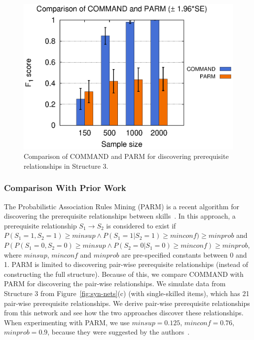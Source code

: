 \documentclass{edm_template}
\begin{document}
			\begin{figure}[ht]
						\begin{center}
							\centering
							\includegraphics[width=0.55\linewidth]{figures/F1_parm.eps}
						\end{center}
						\vspace{-1em}
						\caption{Comparison of COMMAND and PARM for discovering prerequisite relationships in Structure 3. %
						}
						\label{fig:f1-parm}
						\vspace{-1em} 
					\end{figure} 				
	\subsubsection{Comparison With Prior Work}
	The Probabilistic Association Rules Mining (PARM) is a recent algorithm for discovering the prerequisite relationships between skills~\cite{chen2015discovering}.
	In this approach, a prerequisite relationship $S_1\rightarrow S_2$ is considered to exist if
	$P(S_1=1,S_2=1) \ge minsup \wedge P(S_1=1|S_2=1)\ge minconf) \ge minprob$ and $P(P(S_1=0,S_2=0) \ge minsup \wedge P(S_2=0|S_1=0)\ge minconf) \ge minprob$, 
	where $minsup$, $minconf$ and $minprob$ are pre-specified constants between 0 and 1.
	PARM is limited to discovering pair-wise prerequisite relationships (instead of constructing the full structure).
	Because of this, we compare COMMAND with PARM for discovering the pair-wise relationships.
	We simulate data from Structure 3 from Figure~\ref{fig:syn-nets}(c) (with single-skilled items), which has 21 pair-wise prerequisite relationships.
	We derive pair-wise prerequisite relationships from this network  and see how the two approaches discover these relationships.
	When experimenting with PARM, we use $ minsup=0.125$, $minconf=0.76$, $minprob=0.9$, because they were suggested by the authors~\cite{chen2015discovering}.
	
\end{document}
